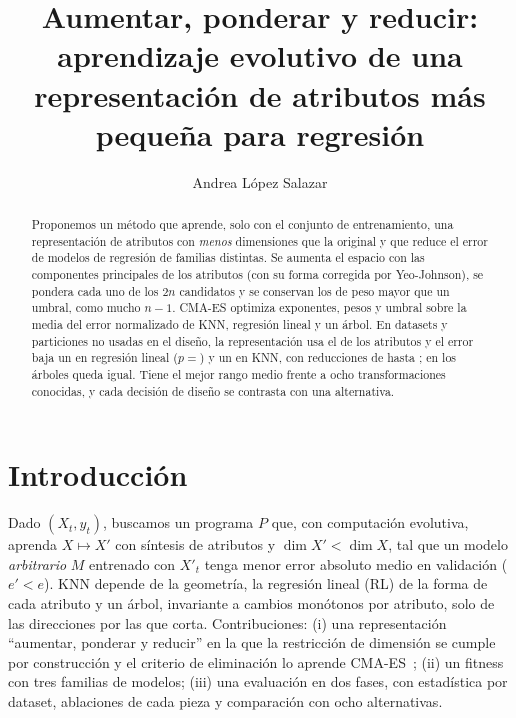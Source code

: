 \documentclass[runningheads]{llncs}
\begin{document}
\title{Aumentar, ponderar y reducir: aprendizaje evolutivo de una representación de atributos más pequeña para
regresión}
\author{Andrea López Salazar}
\maketitle

\begin{abstract}
Proponemos un método que aprende, solo con el conjunto de entrenamiento, una representación de atributos con
\emph{menos} dimensiones que la original y que reduce el error de modelos de regresión de familias distintas. Se
aumenta el espacio con las componentes principales de los atributos (con su forma corregida por Yeo-Johnson), se
pondera cada uno de los $2n$ candidatos y se conservan los de peso mayor que un umbral, como mucho $n-1$. CMA-ES
optimiza exponentes, pesos y umbral sobre la media del error normalizado de KNN, regresión lineal y un árbol. En
\nDatasets{} datasets y \nParticiones{} particiones no usadas en el diseño, la representación usa el \dimMedia{} de
los atributos y el error baja un \cambioRL{} en regresión lineal ($p=$\pRL) y un \cambioKNN{} en KNN, con reducciones de
hasta \maxRL{}; en los árboles queda igual. Tiene el mejor rango medio frente a ocho transformaciones conocidas, y
cada decisión de diseño se contrasta con una alternativa.
\end{abstract}

\section{Introducción}
Dado $(X_t,y_t)$, buscamos un programa $P$ que, con computación evolutiva, aprenda $X\mapsto X'$ con síntesis de
atributos y $\dim X'<\dim X$, tal que un modelo \emph{arbitrario} $M$ entrenado con $X'_t$ tenga menor error absoluto
medio en validación ($e'<e$). KNN depende de la geometría, la regresión lineal (RL) de la forma de cada atributo y un
árbol, invariante a cambios monótonos por atributo, solo de las direcciones por las que corta. Contribuciones: (i) una
representación ``aumentar, ponderar y reducir'' en la que la restricción de dimensión se cumple por construcción y el
criterio de eliminación lo aprende CMA-ES~\cite{hansen2001}; (ii) un fitness con tres familias de modelos; (iii) una
evaluación en dos fases, con estadística por dataset, ablaciones de cada pieza y comparación con ocho alternativas.
\end{document}
